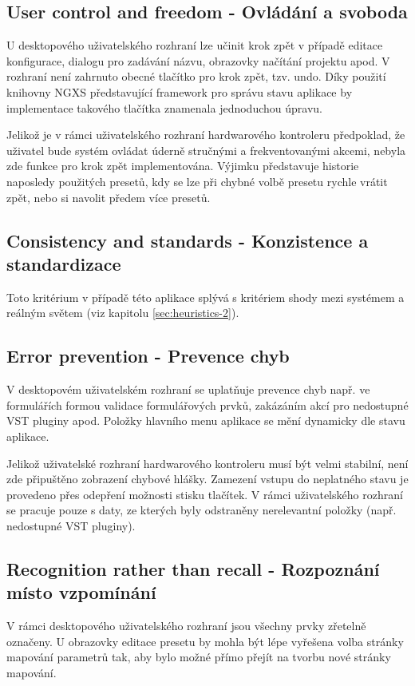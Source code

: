 \documentclass[thesis=M,czech]{FITthesis}[2019/03/06]
\begin{document}
		\subsection{User control and freedom - Ovládání a svoboda}
			U desktopového uživatelského rozhraní lze učinit krok zpět v případě editace konfigurace, dialogu pro zadávání názvu, obrazovky načítání projektu apod. V rozhraní není zahrnuto obecné tlačítko pro krok zpět, tzv. undo. Díky použití knihovny NGXS představující framework pro správu stavu aplikace by implementace takového tlačítka znamenala jednoduchou úpravu.
			
			Jelikož je v rámci uživatelského rozhraní hardwarového kontroleru předpoklad, že uživatel bude systém ovládat úderně stručnými a frekventovanými akcemi, nebyla zde funkce pro krok zpět implementována. Výjimku představuje historie naposledy použitých presetů, kdy se lze při chybné volbě presetu rychle vrátit zpět, nebo si navolit předem více presetů.
			
		\subsection{Consistency and standards - Konzistence a standardizace}
			Toto kritérium v případě této aplikace splývá s kritériem shody mezi systémem a reálným světem (viz kapitolu \ref{sec:heuristics-2}).
		
		\subsection{Error prevention - Prevence chyb}
			V desktopovém uživatelském rozhraní se uplatňuje prevence chyb např. ve formulářích formou validace formulářových prvků, zakázáním akcí pro nedostupné VST pluginy apod. Položky hlavního menu aplikace se mění dynamicky dle stavu aplikace.
			
			Jelikož uživatelské rozhraní hardwarového kontroleru musí být velmi stabilní, není zde připuštěno zobrazení chybové hlášky. Zamezení vstupu do neplatného stavu je provedeno přes odepření možnosti stisku tlačítek.
			V rámci uživatelského rozhraní se pracuje pouze s daty, ze kterých byly odstraněny nerelevantní položky
			(např. nedostupné VST pluginy).
					
		\subsection{Recognition rather than recall - Rozpoznání místo vzpomínání}
			V rámci desktopového uživatelského rozhraní jsou všechny prvky zřetelně označeny. U obrazovky editace presetu by mohla být lépe vyřešena volba stránky mapování parametrů tak, aby bylo možné přímo přejít na tvorbu nové stránky mapování.
			
\end{document}
